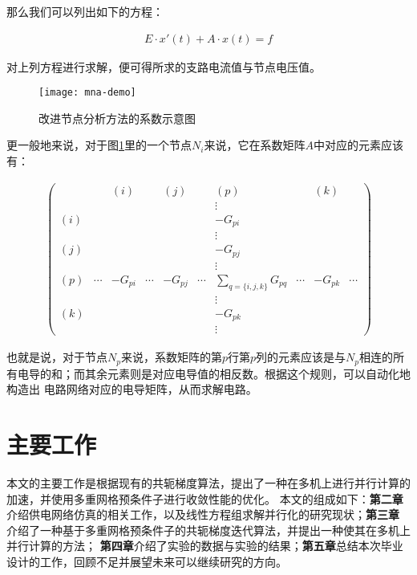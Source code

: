  那么我们可以列出如下的方程：

 \begin{align} E \cdot x'(t) +
  A \cdot x(t) = f \end{align}

 对上列方程进行求解，便可得所求的支路电流值与节点电压值。

 \begin{figure}[H]
   \centering
   \texttt{[image: mna-demo]}
   \caption{改进节点分析方法的系数示意图}
   \label{fig:figmna}
 \end{figure}

 更一般地来说，对于图\ref{fig:figmna}里的一个节点$N_i$来说，它在系数矩阵$A$中对应的元素应该有：

\begin{align}
 \begin{pmatrix}
 & & (i) &  & (j) & & (p) & & (k)& \\
 & & & & & & \vdots & & & \\
 (i) & & & & & & -G_{pi} & & & \\
 & & & & & & \vdots & & & \\
 (j) & & & & & & -G_{pj} & & & \\
 & & & & & & \vdots & & & \\
 (p) & \cdots & -G_{pi} & \cdots & -G_{pj} & \cdots & \sum_{q=\{i,j,k\}} G_{pq}  & \cdots & -G_{pk} & \cdots \\
 & & & & & & \vdots & & & \\
 (k) & & & & & & -G_{pk}& & & \\
 & & & & & & \vdots & & &
 \end{pmatrix}
 \label{Geq}
 \end{align}

也就是说，对于节点$N_p$来说，系数矩阵的第$p$行第$p$列的元素应该是与$N_p$相连的所有电导的和；而其余元素则是对应电导值的相反数。根据这个规则，可以自动化地构造出
电路网络对应的电导矩阵，从而求解电路。

\section{主要工作}

本文的主要工作是根据现有的共轭梯度算法，提出了一种在多机上进行并行计算的加速，并使用多重网格预条件子进行收敛性能的优化。
本文的组成如下：\textbf{第二章}介绍供电网络仿真的相关工作，以及线性方程组求解并行化的研究现状；\textbf{第三章}
介绍了一种基于多重网格预条件子的共轭梯度迭代算法，并提出一种使其在多机上并行计算的方法；
\textbf{第四章}介绍了实验的数据与实验的结果；\textbf{第五章}总结本次毕业设计的工作，回顾不足并展望未来可以继续研究的方向。
